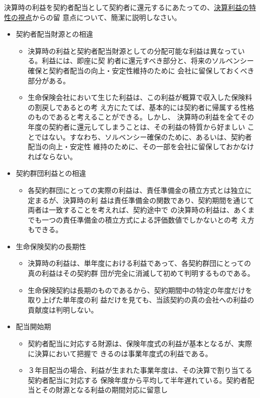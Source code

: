 \documentclass[report,gutter=10mm,fore-edge=10mm,uplatex,dvipdfmx]{jlreq}
\begin{document}
決算時の利益を契約者配当として契約者に還元するにあたっての、\underline{決算利益の特性の視点}からの留
意点について、簡潔に説明しなさい。
\begin{itemize}
 \item 契約者配当財源との相違
\begin{itemize}
 \item  決算時の利益と契約者配当財源としての分配可能な利益は異なっている。利益には、即座に契
 約者に還元すべき部分と、将来のソルベンシー確保と契約者配当の向上・安定性維持のために
 会社に留保しておくべき部分がある。
\item  生命保険会社において生じた利益は、この利益が概算で収入した保険料の割戻しであるとの考
 え方にたてば、基本的には契約者に帰属する性格のものであると考えることができる。しかし、
 決算時の利益を全てその年度の契約者に還元してしまうことは、その利益の特質から好ましい
 ことではない。すなわち、ソルベンシー確保のために、あるいは、契約者配当の向上・安定性
 維持のために、その一部を会社に留保しておかなければならない。
\end{itemize} 
\item 契約群団利益との相違
\begin{itemize}
 \item  各契約群団にとっての実際の利益は、責任準備金の積立方式とは独立に定まるが、決算時の利
 益は責任準備金の関数であり、契約期間を通じて両者は一致することを考えれば、契約途中で
 の決算時の利益は、あくまでも一つの責任準備金の積立方式による評価数値でしかないとの考
 え方もできる。
\end{itemize} 
\item 生命保険契約の長期性
\begin{itemize}
 \item  決算時の利益は、単年度における利益であって、各契約群団にとっての真の利益はその契約群
 団が完全に消滅して初めて判明するものである。
\item  生命保険契約は長期のものであるから、契約期間中の特定の年度だけを取り上げた単年度の利
 益だけを見ても、当該契約の真の会社への利益の貢献度は判明しない。
\end{itemize} 
\item 配当開始期
\begin{itemize}
 \item  契約者配当に対応する財源は、保険年度式の利益が基本となるが、実際に決算において把握で
 きるのは事業年度式の利益である。
\item  ３年目配当の場合、利益が生まれた事業年度は、その決算で割り当てる契約者配当に対応する
 保険年度から平均して半年遅れている。契約者配当とその財源となる利益の期間対応に留意し

\end{itemize}
\end{itemize}
\end{document}

